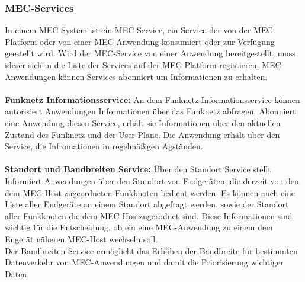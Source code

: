 \documentclass[runningheads]{llncs}
\numberwithin{figure}{section}
\begin{document}
\subsubsection{MEC-Services}
In einem MEC-System ist ein MEC-Service, ein Service der von der MEC-Platform oder von einer MEC-Anwendung konsumiert oder zur Verfügung geestellt wird. 
Wird der MEC-Service von einer Anwendung bereitgestellt, muss ideser sich in die Liste der Services auf der MEC-Platform registieren. MEC-Anwendungen können 
Services abonniert um Informationen zu erhalten. 
\\
\\
\textbf{Funknetz Informationsservice:}
An dem Funknetz Informationsservice können autorisiert Anwendungen Informationen über das Funknetz abfragen.
Abonniert eine Anwendung diesen Service, erhält sie Informationen über den aktuellen Zustand des Funknetz und der User Plane. Die Anwendung erhält über den Service,
die Infromationen in regelmäßigen Agständen.
\\
\\
\textbf{Standort und Bandbreiten Service:}
Über den Standort Service stellt Informiert Anwendungen über den Standort von Endgeräten, 
die derzeit von den dem MEC-Host zugeordneten Funkknoten bedient werden. Es können auch eine Liste aller Endgeräte an einem Standort abgefragt werden, sowie der Standort aller
Funkknoten die dem MEC-Hostzugerodnet sind. Diese Informationen sind wichtig für die Entscheidung, ob ein eine MEC-Anwendung zu einem dem Engerät näheren MEC-Host wechseln soll.
\\
Der Bandbreiten Service ermöglicht das Erhöhen der Bandbreite für bestimmten Datenverkehr von MEC-Anwendungen und damit die Priorisierung wichtiger Daten.
\end{document}
